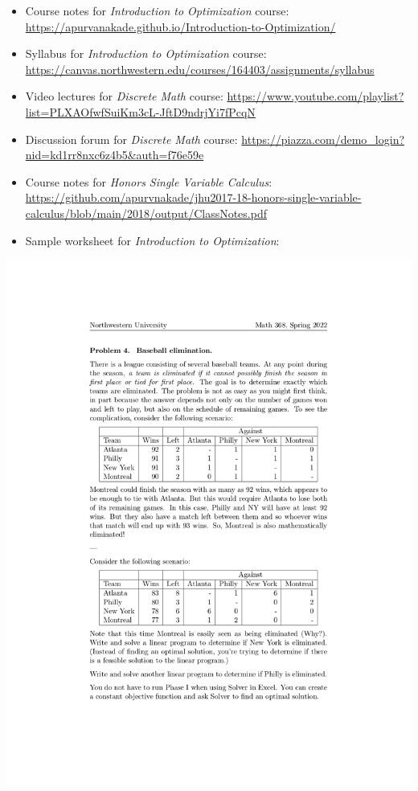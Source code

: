 \documentclass[
]{report}
\begin{document}
\begin{itemize}
\item
  Course notes for \emph{Introduction to Optimization} course: \url{https://apurvanakade.github.io/Introduction-to-Optimization/}
\item
  Syllabus for \emph{Introduction to Optimization} course: \url{https://canvas.northwestern.edu/courses/164403/assignments/syllabus}
\item
  Video lectures for \emph{Discrete Math} course: \url{https://www.youtube.com/playlist?list=PLXAOfwfSuiKm3cL-JftD9ndrjYi7fPcqN}
\item
  Discussion forum for \emph{Discrete Math} course: \url{https://piazza.com/demo_login?nid=kd1rr8nxc6z4b5\&auth=f76e59e}
\item
  Course notes for \emph{Honors Single Variable Calculus}: \url{https://github.com/apurvnakade/jhu2017-18-honors-single-variable-calculus/blob/main/2018/output/ClassNotes.pdf}
\item
  Sample worksheet for \emph{Introduction to Optimization}:
\end{itemize}

\includegraphics{images/Math 368 Discussion Worksheet Example.jpg}
\end{document}
